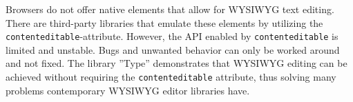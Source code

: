 % 
% 
%
Browsers do not offer native elements that allow for WYSIWYG text editing. There are third-party libraries that emulate these elements by utilizing the \texttt{contenteditable}-attribute. However, the API enabled by \texttt{contenteditable} is limited and unstable. Bugs and unwanted behavior can only be worked around and not fixed. The library ''Type'' demonstrates that WYSIWYG editing can be achieved without requiring the \texttt{contenteditable} attribute, thus solving many problems contemporary WYSIWYG editor libraries have.
